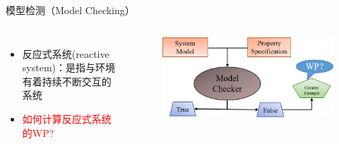 \documentclass[aspectratio=1610, 9pt, CJK]{beamer}
\begin{document}
\begin{frame}
\begin{block}{模型检测（Model Checking）}
\begin{columns}
\begin{itemize}
				\item 反应式系统(reactive system)：是指与环境有着持续不断交互的系统
				\item \textcolor{red}{如何计算反应式系统的WP?}
			\end{itemize}
			\begin{figure}
				\includegraphics[scale=0.35]{figures/MC}
			\end{figure}
		\end{columns}
	\end{block}

	\end{frame}
\end{document}
